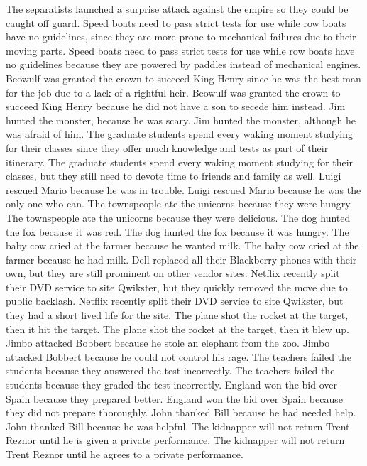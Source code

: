 \documentclass{article}
\begin{document}
\begin{enumerate}
	The separatists launched a surprise attack against the empire so they could be caught off guard.
	Speed boats need to pass strict tests for use while row boats have no guidelines, since they are more prone to mechanical failures due to their moving parts.
	Speed boats need to pass strict tests for use while row boats have no guidelines because they are powered by paddles instead of mechanical engines.
	Beowulf was granted the crown to succeed King Henry since he was the best man for the job due to a lack of a rightful heir.
	Beowulf was granted the crown to succeed King Henry because he did not have a son to secede him instead.
	Jim hunted the monster, because he was scary.
	Jim hunted the monster, although he was afraid of him.
	The graduate students spend every waking moment studying for their classes since they offer much knowledge and tests as part of their itinerary.
	The graduate students spend every waking moment studying for their classes, but they still need to devote time to friends and family as well.
	Luigi rescued Mario because he was in trouble.
	Luigi rescued Mario because he was the only one who can.
	The townspeople ate the unicorns because they were hungry.
	The townspeople ate the unicorns because they were delicious.
	The dog hunted the fox because it was red.
	The dog hunted the fox because it was hungry.
	The baby cow cried at the farmer because he wanted milk.
	The baby cow cried at the farmer because he had milk.
	Dell replaced all their Blackberry phones with their own, but they are still prominent on other vendor sites.
	Netflix recently split their DVD service to site Qwikster, but they quickly removed the move due to public backlash.
	Netflix recently split their DVD service to site Qwikster, but they had a short lived life for the site.
	The plane shot the rocket at the target, then it hit the target.
	The plane shot the rocket at the target, then it blew up.
	Jimbo attacked Bobbert because he stole an elephant from the zoo.
	Jimbo attacked Bobbert because he could not control his rage.
	The teachers failed the students because they answered the test incorrectly.
	The teachers failed the students because they graded the test incorrectly.
	England won the bid over Spain because they prepared better.
	England won the bid over Spain because they did not prepare thoroughly.
	John thanked Bill because he had needed help.
	John thanked Bill because he was helpful.
	The kidnapper will not return Trent Reznor until he is given a private performance.
	The kidnapper will not return Trent Reznor until he agrees to a private performance.

\end{enumerate}
\end{document}
